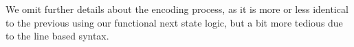 We omit further details about the encoding process, as it is more or less identical to the previous using our functional next state logic, but a bit more tedious due to the line based syntax.


%
%
%
%
%


